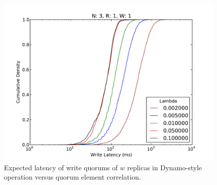 \documentclass{vldb}
\begin{document}
\begin{figure}
\centering
\includegraphics[width=.8\columnwidth]{figs/write-cdf.pdf}
\caption{Expected latency of write quorums of $w$ replicas in Dynamo-style operation versus quorum element correlation.}
\label{fig:correlation}
\end{figure}
\end{document}
